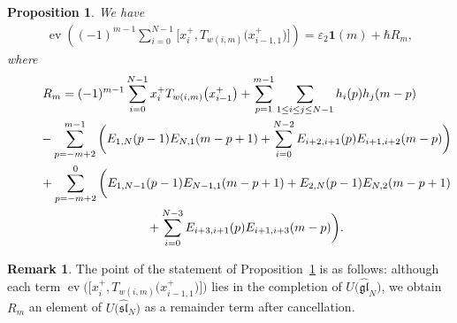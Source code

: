 \documentclass[10pt,a4paper]{amsart}
\newtheorem{prop}[thm]{Proposition}
\theoremstyle{definition}
\newtheorem{rem}[thm]{Remark}
\numberwithin{equation}{section}
\DeclareMathOperator{\ev}{ev}
\newcommand{\ve}{\varepsilon}
\newcommand{\gl}{\mathfrak{gl}}
\newcommand{\affsl}{\hat{\mathfrak{sl}}_N}
\newcommand{\bfid}{\mathbf{1}}
\begin{document}
\begin{prop}\label{prop:Heisenberg}
We have
\begin{gather}
\ev\left( (-1)^{m-1} \sum_{i=0}^{N-1} \big[x_{i}^+, T_{w(i,m)}\big(x_{i-1,1}^+\big)\big] \right) = \ve_2 \bfid(m) + \hbar R_m, \label{eq:Heisenberg}
\end{gather}
where
\begin{gather*}
R_m= (-1)^{m-1}\sum_{i=0}^{N-1} x_{i}^+ T_{w(i,m)}\big(x_{i-1}^+\big) + \sum_{p=1}^{m-1} \sum_{1 \leq i \leq j \leq N-1} h_i(p)h_j(m-p) \\
\hphantom{R_m=}{} - \sum_{p=-m+2}^{m-1} \bigg( E_{1,N}(p-1)E_{N,1}(m-p+1) + \sum_{i=0}^{N-2} E_{i+2,i+1}(p)E_{i+1,i+2}(m-p) \bigg) \\
\hphantom{R_m=}{} + \sum_{p=-m+2}^{0} \bigg( E_{1,N-1}(p-1)E_{N-1,1}(m-p+1) +E_{2,N}(p-1)E_{N,2}(m-p+1) \\
\hphantom{R_m=}{} + \sum_{i=0}^{N-3} E_{i+3,i+1}(p)E_{i+1,i+3}(m-p) \bigg).
\end{gather*}
\end{prop}

\begin{rem}The point of the statement of Proposition~\ref{prop:Heisenberg} is as follows: although each term $\ev\big(\big[x_{i}^+, T_{w(i,m)}\big(x_{i-1,1}^+\big)\big]\big)$ lies in the completion of $U\big(\hat{\gl}_N\big)$, we obtain $R_m$ an element of $U\big(\affsl\big)$ as a remainder term after cancellation.
\end{rem}
\end{document}
